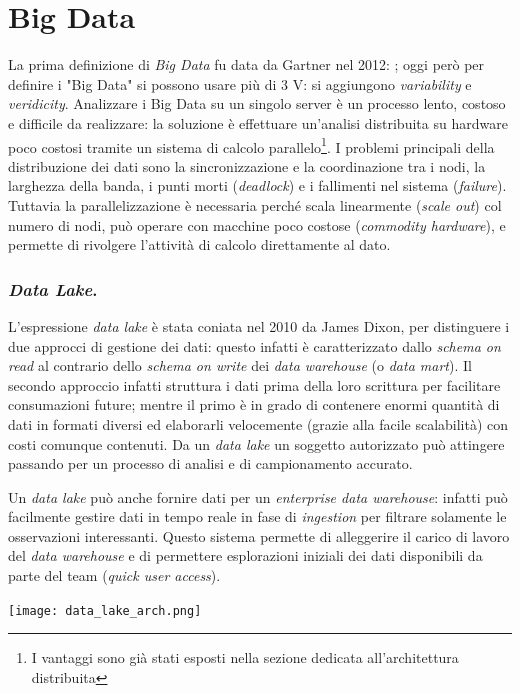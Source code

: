 \documentclass[a4page, 11pt]{article}
\begin{document}
\part{Big Data}
La prima definizione di \textit{Big Data} fu data da Gartner nel 2012: \cite{Big data is high volume, high velocity and/or high variety information assets}; oggi però per definire i "Big Data" si possono usare più di 3 V: si aggiungono \textit{variability} e \textit{veridicity}.
Analizzare i Big Data su un singolo server è un processo lento, costoso e difficile da realizzare: la soluzione è effettuare un’analisi distribuita su hardware poco costosi tramite un sistema di calcolo parallelo\footnote{I vantaggi sono già stati esposti nella sezione dedicata all'architettura distribuita}.
I problemi principali della distribuzione dei dati sono la sincronizzazione e la coordinazione tra i nodi, la larghezza della banda, i punti morti (\textit{deadlock}) e i fallimenti nel sistema (\textit{failure}).
Tuttavia la parallelizzazione è necessaria perché scala linearmente (\textit{scale out}) col numero di nodi, può operare con macchine poco costose (\textit{commodity hardware}), e permette di rivolgere l'attività di calcolo direttamente al dato.


\section{\textit{Data Lake}.}
L'espressione \textit{data lake} è stata coniata nel 2010 da James Dixon, per distinguere i due approcci di gestione dei dati: questo infatti è caratterizzato dallo \textit{schema on read} al contrario dello \textit{schema on write} dei \textit{data warehouse} (o \textit{data mart}).
Il secondo approccio infatti struttura i dati prima della loro scrittura per facilitare consumazioni future; mentre il primo è in grado di contenere enormi quantità di dati in formati diversi ed elaborarli velocemente (grazie alla facile scalabilità) con costi comunque contenuti.
Da un \textit{data lake} un soggetto autorizzato può attingere passando per un processo di analisi e di campionamento accurato.

Un \textit{data lake} può anche fornire dati per un \textit{enterprise data warehouse}: infatti può facilmente gestire dati in tempo reale in fase di \textit{ingestion} per filtrare solamente le osservazioni interessanti.
Questo sistema permette di alleggerire il carico di lavoro del \textit{data warehouse} e di permettere esplorazioni iniziali dei dati disponibili da parte del team (\textit{quick user access}).
\begin{center}
  \texttt{[image: data\_lake\_arch.png]}
\end{center}
\end{document}
